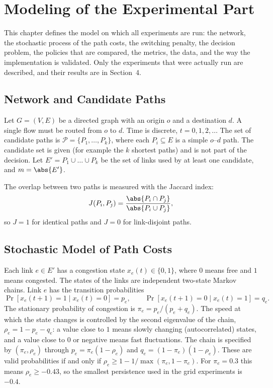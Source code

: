 
\section{Modeling of the Experimental Part}
\label{sec:model}

This chapter defines the model on which all experiments are run: the network, the stochastic process of the path costs, the switching penalty, the decision problem, the policies that are compared, the metrics, the data, and the way the implementation is validated. Only the experiments that were actually run are described, and their results are in Section~4.

\subsection{Network and Candidate Paths}

Let $G = (V, E)$ be a directed graph with an origin $o$ and a destination $d$. A single flow must be routed from $o$ to $d$. Time is discrete, $t = 0, 1, 2, \dots$ The set of candidate paths is $\mathcal{P} = \{P_1, \dots, P_k\}$, where each $P_i \subseteq E$ is a simple $o$--$d$ path. The candidate set is given (for example the $k$ shortest paths) and is not part of the decision. Let $E' = P_1 \cup \dots \cup P_k$ be the set of links used by at least one candidate, and $m = \abs{E'}$.

The overlap between two paths is measured with the Jaccard index:
\begin{equation}
  J(P_i, P_j) = \frac{\abs{P_i \cap P_j}}{\abs{P_i \cup P_j}},
  \label{eq:jaccard}
\end{equation}
so $J = 1$ for identical paths and $J = 0$ for link-disjoint paths.

\subsection{Stochastic Model of Path Costs}

Each link $e \in E'$ has a congestion state $x_e(t) \in \{0, 1\}$, where $0$ means free and $1$ means congested. The states of the links are independent two-state Markov chains. Link $e$ has the transition probabilities
\begin{equation}
  \Pr[x_e(t+1) = 1 \mid x_e(t) = 0] = p_e, \qquad
  \Pr[x_e(t+1) = 0 \mid x_e(t) = 1] = q_e.
  \label{eq:markov}
\end{equation}
The stationary probability of congestion is $\pi_e = p_e/(p_e+q_e)$. The speed at which the state changes is controlled by the second eigenvalue of the chain, $\rho_e = 1 - p_e - q_e$: a value close to $1$ means slowly changing (autocorrelated) states, and a value close to $0$ or negative means fast fluctuations. The chain is specified by $(\pi_e, \rho_e)$ through $p_e = \pi_e (1-\rho_e)$ and $q_e = (1-\pi_e)(1-\rho_e)$. These are valid probabilities if and only if $\rho_e \ge 1 - 1/\max(\pi_e, 1-\pi_e)$. For $\pi_e = 0.3$ this means $\rho_e \ge -0.43$, so the smallest persistence used in the grid experiments is $-0.4$.

